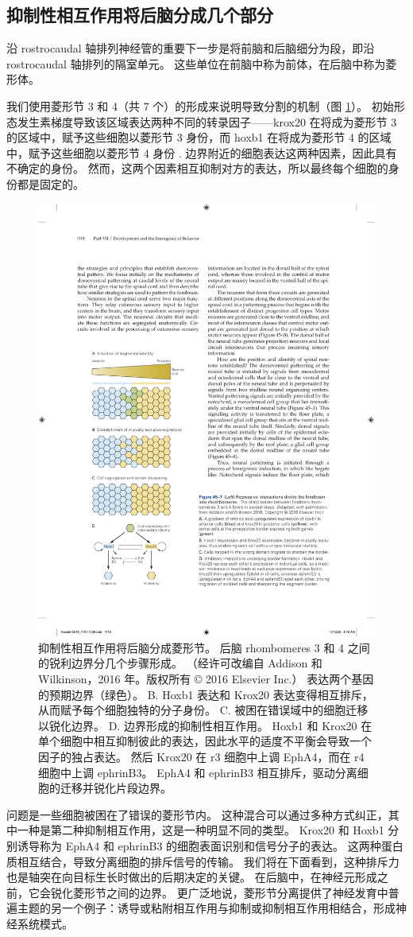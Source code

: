 \subsection{抑制性相互作用将后脑分成几个部分}

沿 rostrocaudal 轴排列神经管的重要下一步是将前脑和后脑细分为段，即沿 rostrocaudal 轴排列的隔室单元。 这些单位在前脑中称为前体，在后脑中称为菱形体。

我们使用菱形节 3 和 4（共 7 个）的形成来说明导致分割的机制（图 \ref{fig:45_7}）。 
初始形态发生素梯度导致该区域表达两种不同的转录因子——krox20 在将成为菱形节 3 的区域中，赋予这些细胞以菱形节 3 身份，而 hoxb1 在将成为菱形节 4 的区域中，赋予这些细胞以菱形节 4 身份 . 边界附近的细胞表达这两种因素，因此具有不确定的身份。 然而，这两个因素相互抑制对方的表达，所以最终每个细胞的身份都是固定的。

\begin{figure}[htbp]
	\centering
	\includegraphics[width=0.5\linewidth]{chap45/fig_45_7}
	\caption{抑制性相互作用将后脑分成菱形节。 后脑 rhombomeres 3 和 4 之间的锐利边界分几个步骤形成。 （经许可改编自 Addison 和 Wilkinson，2016 年。版权所有 © 2016 Elsevier Inc.） 表达两个基因的预期边界（绿色）。 B. Hoxb1 表达和 Krox20 表达变得相互排斥，从而赋予每个细胞独特的分子身份。 C. 被困在错误域中的细胞迁移以锐化边界。 D. 边界形成的抑制性相互作用。 Hoxb1 和 Krox20 在单个细胞中相互抑制彼此的表达，因此水平的适度不平衡会导致一个因子的独占表达。 然后 Krox20 在 r3 细胞中上调 EphA4，而在 r4 细胞中上调 ephrinB3。 EphA4 和 ephrinB3 相互排斥，驱动分离细胞的迁移并锐化片段边界。}
	\label{fig:45_7}
\end{figure}

问题是一些细胞被困在了错误的菱形节内。 这种混合可以通过多种方式纠正，其中一种是第二种抑制相互作用，这是一种明显不同的类型。 Krox20 和 Hoxb1 分别诱导称为 EphA4 和 ephrinB3 的细胞表面识别和信号分子的表达。 这两种蛋白质相互结合，导致分离细胞的排斥信号的传输。 我们将在下面看到，这种排斥力也是轴突在向目标生长时做出的后期决定的关键。 在后脑中，在神经元形成之前，它会锐化菱形节之间的边界。 更广泛地说，菱形节分离提供了神经发育中普遍主题的另一个例子：诱导或粘附相互作用与抑制或抑制相互作用相结合，形成神经系统模式。

